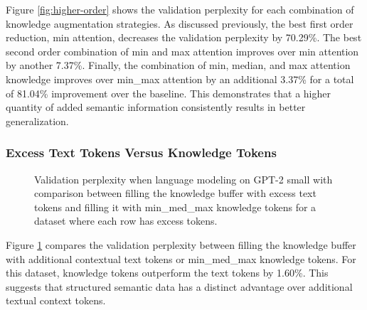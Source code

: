 \documentclass[phd,electronic,oneside,twosidetoc,letterpaper,chaptercenter,parttop,lof]{byumsphd}
\begin{document}
Figure \ref{fig:higher-order} shows the validation perplexity for each combination of knowledge augmentation strategies. 
As discussed previously, the best first order reduction, min attention,  decreases the validation perplexity by 70.29\%.
The best second order combination of min and max attention improves over min attention by another 7.37\%.
Finally, the combination of min, median, and max attention knowledge improves over min\_max attention by an additional 3.37\% for a total of 81.04\% improvement over the baseline.
This demonstrates that a higher quantity of added semantic information consistently results in better generalization.

\subsubsection{Excess Text Tokens Versus Knowledge Tokens}

\begin{figure}
\centering
{}  
    \caption[Excess Text vs. Knowledge]{
        Validation perplexity when language modeling on GPT-2 small with comparison between filling the knowledge buffer with excess text tokens and filling it with min\_med\_max knowledge tokens for a dataset where each row has excess tokens.
    }
    \label{fig:text-knowledge-baseline-chart}
\end{figure}

Figure \ref{fig:text-knowledge-baseline-chart} compares the validation perplexity between filling the knowledge buffer with additional contextual text tokens or min\_med\_max knowledge tokens.
For this dataset, knowledge tokens outperform the text tokens by 1.60\%.
This suggests that structured semantic data has a distinct advantage over additional textual context tokens. 
\end{document}
